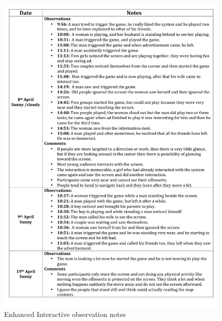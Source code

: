 \begin{appendices}
\begin{figure}[H]
 \centering 
    \includegraphics[width=\textwidth,height=0.8\textheight]{Appendices/9/Observation_notes.pdf}
    \caption{Enhanced Interactive observation notes}
     \label{app:EnhancedInteractiveobservationnotes}%
\end{figure}



\end{appendices}
